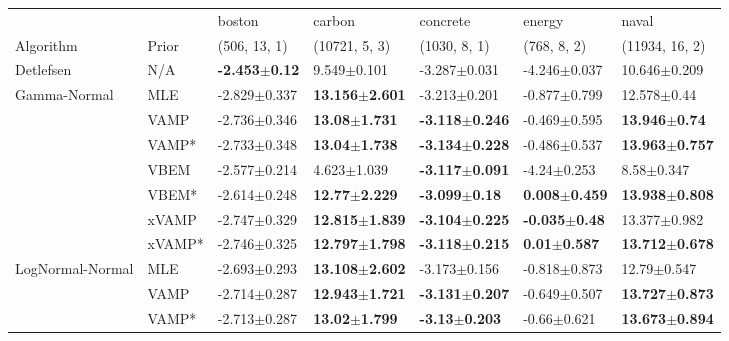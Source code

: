 \begin{tabular}{lllllll}
\toprule
                 &        &                    boston &                     carbon &                   concrete &                     energy &                      naval \\
Algorithm & Prior& (506, 13, 1)& (10721, 5, 3)& (1030, 8, 1)& (768, 8, 2)& (11934, 16, 2)\\
\midrule
Detlefsen & N/A &  \textbf{-2.453$\pm$0.12} &            9.549$\pm$0.101 &           -3.287$\pm$0.031 &           -4.246$\pm$0.037 &           10.646$\pm$0.209 \\
Gamma-Normal & MLE &          -2.829$\pm$0.337 &  \textbf{13.156$\pm$2.601} &           -3.213$\pm$0.201 &           -0.877$\pm$0.799 &            12.578$\pm$0.44 \\
                 & VAMP &          -2.736$\pm$0.346 &   \textbf{13.08$\pm$1.731} &  \textbf{-3.118$\pm$0.246} &           -0.469$\pm$0.595 &   \textbf{13.946$\pm$0.74} \\
                 & VAMP* &          -2.733$\pm$0.348 &   \textbf{13.04$\pm$1.738} &  \textbf{-3.134$\pm$0.228} &           -0.486$\pm$0.537 &  \textbf{13.963$\pm$0.757} \\
                 & VBEM &          -2.577$\pm$0.214 &            4.623$\pm$1.039 &  \textbf{-3.117$\pm$0.091} &            -4.24$\pm$0.253 &             8.58$\pm$0.347 \\
                 & VBEM* &          -2.614$\pm$0.248 &   \textbf{12.77$\pm$2.229} &   \textbf{-3.099$\pm$0.18} &   \textbf{0.008$\pm$0.459} &  \textbf{13.938$\pm$0.808} \\
                 & xVAMP &          -2.747$\pm$0.329 &  \textbf{12.815$\pm$1.839} &  \textbf{-3.104$\pm$0.225} &   \textbf{-0.035$\pm$0.48} &           13.377$\pm$0.982 \\
                 & xVAMP* &          -2.746$\pm$0.325 &  \textbf{12.797$\pm$1.798} &  \textbf{-3.118$\pm$0.215} &    \textbf{0.01$\pm$0.587} &  \textbf{13.712$\pm$0.678} \\
LogNormal-Normal & MLE &          -2.693$\pm$0.293 &  \textbf{13.108$\pm$2.602} &           -3.173$\pm$0.156 &           -0.818$\pm$0.873 &            12.79$\pm$0.547 \\
                 & VAMP &          -2.714$\pm$0.287 &  \textbf{12.943$\pm$1.721} &  \textbf{-3.131$\pm$0.207} &           -0.649$\pm$0.507 &  \textbf{13.727$\pm$0.873} \\
                 & VAMP* &          -2.713$\pm$0.287 &   \textbf{13.02$\pm$1.799} &   \textbf{-3.13$\pm$0.203} &            -0.66$\pm$0.621 &  \textbf{13.673$\pm$0.894} \\

\end{tabular}
